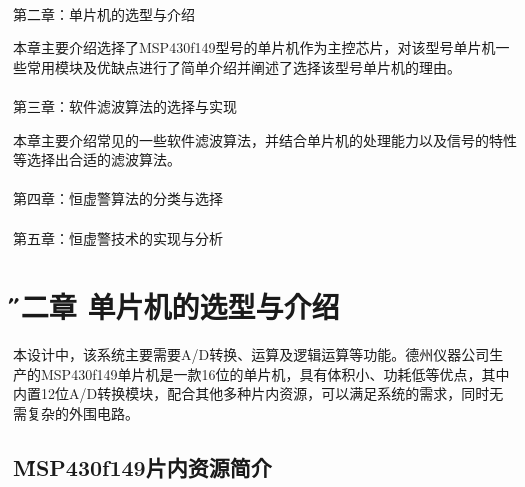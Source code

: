 \documentclass[12pt]{article} %
\newcommand{\xiaosanhao}{\fontsize{15pt}{\baselineskip}\selectfont}    %
\begin{document}
         \paragraph{ \quad} 第二章：单片机的选型与介绍
          \par 本章主要介绍选择了MSP430f149型号的单片机作为主控芯片，对该型号单片机一些常用模块及优缺点进行了简单介绍并阐述了选择该型号单片机的理由。
           \paragraph{ \quad} 第三章：软件滤波算法的选择与实现
          \par 本章主要介绍常见的一些软件滤波算法，并结合单片机的处理能力以及信号的特性等选择出合适的滤波算法。
            \paragraph{ \quad} 第四章：恒虚警算法的分类与选择
             \paragraph{ \quad} 第五章：恒虚警技术的实现与分析
               
               
               
               
                  
                   
                   
                   



\section{\xiaosanhao \H 第二章 \quad 单片机的选型与介绍}
本设计中，该系统主要需要A/D转换、运算及逻辑运算等功能。德州仪器公司生产的MSP430f149单片机是一款16位的单片机，具有体积小、功耗低等优点，其中内置12位A/D转换模块，配合其他多种片内资源，可以满足系统的需求，同时无需复杂的外围电路。
	 \subsection{\H MSP430f149片内资源简介}
	 	
\end{document}
